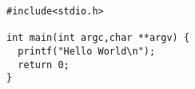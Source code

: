 \documentclass{article}
\begin{document}
\lstset{language=C}
\begin{lstlisting}
#include<stdio.h>

int main(int argc,char **argv) {
  printf("Hello World\n");
  return 0;
}
\end{lstlisting}
\end{document}
